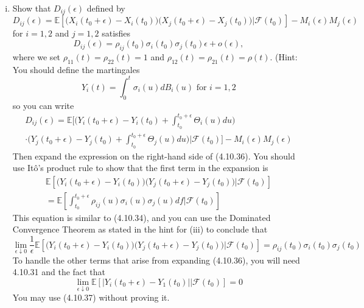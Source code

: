 \documentclass{article}
\newcommand{\E}{\mathbb{E}}
\newcommand{\F}{\mathcal{F}}
\newcommand{\eps}{\epsilon}
\newcommand{\abs}[1]{\left| #1 \right|}
\newcommand{\limit}[1]{\underset{#1}{\lim}}
\theoremstyle{definition}
\theoremstyle{definition}
\begin{document}
\begin{enumerate}
\begin{enumerate}[(i)]
\begin{proof}
\begin{align*}
        &=   \E\left[\limit{\eps \downarrow 0} \frac{1}{\eps} \int_{t_0}^{t_0+\eps} \Theta_i(u) du \bigg|\F(t_0) \right]  \\
        &= \E\left[ \limit{\eps \downarrow 0}\frac{1}{\eps}  \left[ I(0) + I'(0) \eps + o(\eps)  \right] \bigg| \F(t_0)  \right] \\
        &= \E\left[\limit{\eps \downarrow 0}  \left[  \Theta_i(t_0) + \frac{o(\eps)}{\eps} \right] \bigg|\F(t_0) \right] \\
        &= \E\left[ \Theta_i(t_0) \big|\F(t_0)\right] \\
        &= \Theta_i(t_0)
    \end{align*}
       
       
       \end{proof}
       
       \item Show that $D_{ij}(\eps)$ defined by
       $$ D_{ij}(\eps) = \E\left[ \big( X_i(t_0+\eps)-X_i(t_0)\big)\big( X_j(t_0+\eps)-X_j(t_0)\big)|\F(t_0)\right]-M_i(\eps)M_j(\eps)$$
       for $i=1,2$ and $j=1,2$ satisfies
       \begin{equation} D_{ij}(\eps) = \rho_{ij}(t_0)\sigma_i(t_0)\sigma_j(t_0)\eps +o(\eps), \tag{4.10.35} \end{equation}
       where we set $\rho_{11}(t)=\rho_{22}(t)=1$ and $\rho_{12}(t) = \rho_{21}(t)=\rho(t)$. (Hint: You should define the martingales
       $$ Y_i(t)=\int_0^t \sigma_i(u)dB_i(u) \text{ for } i=1,2$$
       so you can write
       \begin{multline}
           D_{ij}(\eps) = \E \bigg[ \bigg( Y_i(t_0+\eps)-Y_i(t_0)+\int_{t_0}^{t_0+\eps} \Theta_i(u)du \bigg) \\
           \cdot \bigg( Y_j(t_0+\eps)-Y_j(t_0)+\int_{t_0}^{t_0+\eps} \Theta_j(u)du \bigg) \bigg|\F(t_0) \bigg]-M_i(\eps)M_j(\eps) \tag{4.10.36}
       \end{multline}
        Then expand the expression on the right-hand side of (4.10.36). You should use It\^{o}'s product rule to show that the first term in the expansion is
        \begin{multline*}
            \E \left[ \big( Y_i(t_0+\eps)-Y_i(t_0) \big) \big( Y_j(t_0+\eps)-Y_j(t_0)\big)  \big| \F(t_0)\right] \\ 
            = \E\left[ \int_{t_0}^{t_0+\eps} \rho_{ij}(u)\sigma_i(u)\sigma_j(u)df \big| \F(t_0) \right]
        \end{multline*}
        This equation is similar to (4.10.34), and you can use the Dominated Convergence Theorem as stated in the hint for (iii) to conclude that 
        $$ \limit{\eps \downarrow 0}\frac{1}{\eps} \E \left[ \big( Y_i(t_0+\eps)-Y_i(t_0) \big) \big( Y_j(t_0+\eps)-Y_j(t_0)\big)  \big| \F(t_0)\right]=\rho_{ij}(t_0)\sigma_i(t_0)\sigma_j(t_0)$$
        To handle the other terms that arise from expanding (4.10.36), you will need 4.10.31 and the fact that
    \begin{equation}
        \limit{\eps \downarrow 0}\E\left[ \abs{Y_i(t_0+\eps)-Y_1(t_0)} | \F(t_0) \right]=0 \tag{4.10.37}
    \end{equation}
    You may use (4.10.37) without proving it.
    

\end{enumerate}
\end{enumerate}
\end{document}
